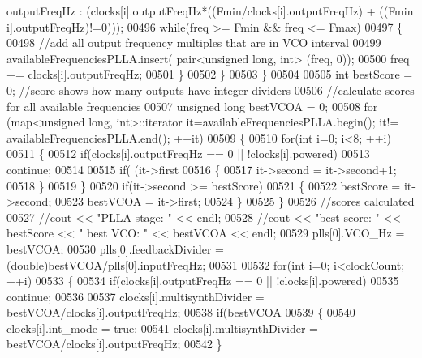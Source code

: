 \begin{DoxyCode}
{      outputFreqHz : (clocks[i].outputFreqHz*((Fmin/clocks[i].outputFreqHz) + ((Fmin%
      i].outputFreqHz)!=0)));
00496             \textcolor{keywordflow}{while}(freq >= Fmin && freq <= Fmax)
00497             \{
00498                 \textcolor{comment}{//add all output frequency multiples that are in VCO interval}
00499                 availableFrequenciesPLLA.insert( pair<unsigned long, int> (freq, 0));
00500                 freq += clocks[i].outputFreqHz;
00501             \}
00502         \}
00503     \}
00504 
00505     \textcolor{keywordtype}{int} bestScore = 0; \textcolor{comment}{//score shows how many outputs have integer dividers}
00506     \textcolor{comment}{//calculate scores for all available frequencies}
00507     \textcolor{keywordtype}{unsigned} \textcolor{keywordtype}{long} bestVCOA = 0;
00508     \textcolor{keywordflow}{for} (map<unsigned long, int>::iterator it=availableFrequenciesPLLA.begin(); it!=
      availableFrequenciesPLLA.end(); ++it)
00509     \{
00510         \textcolor{keywordflow}{for}(\textcolor{keywordtype}{int} i=0; i<8; ++i)
00511         \{
00512             \textcolor{keywordflow}{if}(clocks[i].outputFreqHz == 0 || !clocks[i].powered)
00513                 \textcolor{keywordflow}{continue};
00514 
00515             \textcolor{keywordflow}{if}( (it->first %
00516             \{
00517                 it->second = it->second+1;
00518             \}
00519         \}
00520         \textcolor{keywordflow}{if}(it->second >= bestScore)
00521         \{
00522             bestScore = it->second;
00523             bestVCOA = it->first;
00524         \}
00525     \}
00526     \textcolor{comment}{//scores calculated}
00527     \textcolor{comment}{//cout << "PLLA stage: " << endl;}
00528     \textcolor{comment}{//cout << "best score: " << bestScore << "     best VCO: " << bestVCOA << endl;}
00529     plls[0].VCO_Hz = bestVCOA;
00530     plls[0].feedbackDivider = (double)bestVCOA/plls[0].inputFreqHz;
00531 
00532     \textcolor{keywordflow}{for}(\textcolor{keywordtype}{int} i=0; i<clockCount; ++i)
00533     \{
00534         \textcolor{keywordflow}{if}(clocks[i].outputFreqHz == 0 || !clocks[i].powered)
00535             \textcolor{keywordflow}{continue};
00536 
00537         clocks[i].multisynthDivider = bestVCOA/clocks[i].outputFreqHz;
00538         \textcolor{keywordflow}{if}(bestVCOA%
00539         \{
00540             clocks[i].int_mode = \textcolor{keyword}{true};
00541             clocks[i].multisynthDivider = bestVCOA/clocks[i].outputFreqHz;
00542         \}
}
\end{DoxyCode}
